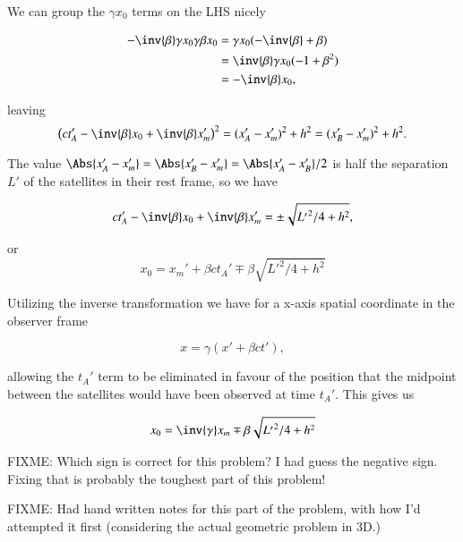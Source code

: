 {We can group the \(\gamma x_0\) terms on the LHS nicely

\begin{equation}\label{eqn:relElectroDynProblemSet1:1540}
\begin{aligned}
- \inv{\beta} \gamma x_0 \gamma \beta x_0
&=
\gamma x_0 ( - \inv{\beta} + \beta ) \\
&=
\inv{\beta} \gamma x_0 ( - 1 + \beta^2 ) \\
&=
-\inv{\beta} x_0,
\end{aligned}
\end{equation}

leaving
\begin{equation}\label{eqn:relElectroDynProblemSet1:1400}
\left( c t_A' -\inv{\beta} x_0 + \inv{\beta} x_m' \right)^2 = (x_A' - x_m')^2 + h^2 = (x_B' - x_m')^2 + h^2.
\end{equation}

The value \(\Abs{x_A' - x_m'} = \Abs{x_B' - x_m'} = \Abs{x_A' - x_B'}/2\) is half the separation \(L'\) of the satellites in their rest frame, so we have

\begin{equation}\label{eqn:relElectroDynProblemSet1:1420}
c t_A' -\inv{\beta} x_0 + \inv{\beta} x_m' = \pm \sqrt{{L'}^2/4 + h^2},
\end{equation}

or
\begin{equation}\label{eqn:relElectroDynProblemSet1:1440}
x_0 = x_m' + \beta c t_A' \mp \beta \sqrt{{L'}^2/4 + h^2}
\end{equation}

Utilizing the inverse transformation we have for a x-axis spatial coordinate in the observer frame

\begin{equation}\label{eqn:relElectroDynProblemSet1:1460}
x = \gamma ( x' + \beta c t'),
\end{equation}

allowing the \(t_A'\) term to be eliminated in favour of the position that the midpoint between the satellites would have been observed at time \(t_A'\).  This gives us

\begin{equation}\label{eqn:relElectroDynProblemSet1:1480}
x_0 = \inv{\gamma} x_m \mp \beta \sqrt{{L'}^2/4 + h^2}
\end{equation}

FIXME: Which sign is correct for this problem?  I had guess the negative sign.  Fixing that is probably the toughest part of this problem!


FIXME: Had hand written notes for this part of the problem, with how I'd attempted it first (considering the actual geometric problem in 3D.)

} %

